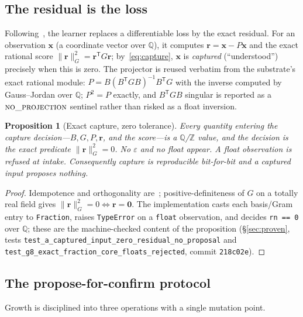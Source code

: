 \documentclass[11pt]{article}
\theoremstyle{plain}
\newtheorem{proposition}[theorem]{Proposition}
\theoremstyle{definition}
\theoremstyle{remark}
\newcommand{\Q}{\mathbb{Q}}
\newcommand{\Z}{\mathbb{Z}}
\newcommand{\rr}{\mathbf{r}}
\newcommand{\xx}{\mathbf{x}}
\newcommand{\GG}{G}
\newcommand{\BB}{B}
\newcommand{\transpose}{^{\mathsf{T}}}
\newcommand{\inv}{^{-1}}
\begin{document}
\subsection{The residual is the loss}
Following~\cite[\S6]{VectorSubstrate}, the learner replaces a differentiable loss by the exact residual. For
an observation $\xx$ (a coordinate vector over $\Q$), it computes $\rr=\xx-P\xx$ and the exact rational score
$\lVert\rr\rVert_\GG^2=\rr\transpose\GG\rr$; by~\eqref{eq:capture}, $\xx$ is \emph{captured} (``understood'')
precisely when this is zero. The projector is reused verbatim from the substrate's exact rational module:
$P=\BB(\BB\transpose\GG\BB)\inv\BB\transpose\GG$ with the inverse computed by Gauss--Jordan over $\Q$;
$P^2=P$ exactly, and $\BB\transpose\GG\BB$ singular is reported as a $\textsc{no\_projection}$ sentinel rather
than risked as a float inversion.

\begin{proposition}[Exact capture, zero tolerance]\label{prop:exactcapture}
Every quantity entering the capture decision---$\BB,\GG,P,\rr$, and the score---is a $\Q$/$\Z$ value, and the
decision is the exact predicate $\lVert\rr\rVert_\GG^2=0$. No $\varepsilon$ and no float appear. A float
observation is refused at intake. Consequently capture is reproducible bit-for-bit and a captured input
proposes nothing.
\end{proposition}
\begin{proof}
Idempotence and orthogonality are~\cite[Prop.~3.2]{VectorSubstrate}; positive-definiteness of $\GG$ on a
totally real field gives $\lVert\rr\rVert_\GG^2=0\Leftrightarrow\rr=\mathbf 0$. The implementation casts each
basis/Gram entry to \texttt{Fraction}, raises \texttt{TypeError} on a \texttt{float} observation, and decides
\texttt{rn == 0} over $\Q$; these are the machine-checked content of the proposition
(\S\ref{sec:proven}, tests \texttt{test\_a\_captured\_input\_zero\_residual\_no\_proposal} and
\texttt{test\_g8\_exact\_fraction\_core\_floats\_rejected}, commit \texttt{218c02e}).
\end{proof}

\subsection{The propose-for-confirm protocol}\label{subsec:protocol}
Growth is disciplined into three operations with a single mutation point.
\end{document}
